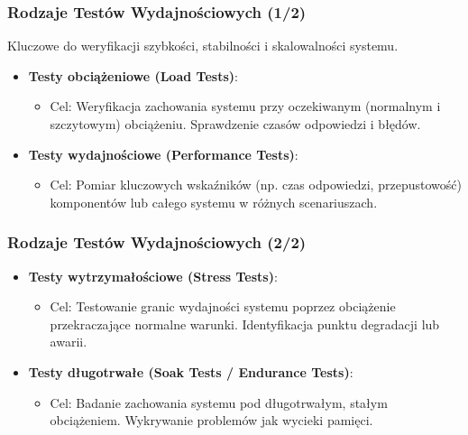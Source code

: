 \documentclass[aspectratio=169,xcolor=table]{beamer}
\begin{document}
\begin{frame}
  \frametitle{Rodzaje Testów Wydajnościowych (1/2)}
  Kluczowe do weryfikacji szybkości, stabilności i skalowalności systemu.
  \begin{itemize}
    \item \textbf{Testy obciążeniowe (Load Tests)}:
        \begin{itemize}
            \item Cel: Weryfikacja zachowania systemu przy oczekiwanym (normalnym i szczytowym) obciążeniu. Sprawdzenie czasów odpowiedzi i błędów.
        \end{itemize}
    \item \textbf{Testy wydajnościowe (Performance Tests)}:
        \begin{itemize}
            \item Cel: Pomiar kluczowych wskaźników (np. czas odpowiedzi, przepustowość) komponentów lub całego systemu w różnych scenariuszach.
        \end{itemize}
  \end{itemize}
\end{frame}

\begin{frame}
  \frametitle{Rodzaje Testów Wydajnościowych (2/2)}
  \begin{itemize}
    \item \textbf{Testy wytrzymałościowe (Stress Tests)}:
        \begin{itemize}
            \item Cel: Testowanie granic wydajności systemu poprzez obciążenie przekraczające normalne warunki. Identyfikacja punktu degradacji lub awarii.
        \end{itemize}
    \item \textbf{Testy długotrwałe (Soak Tests / Endurance Tests)}:
        \begin{itemize}
            \item Cel: Badanie zachowania systemu pod długotrwałym, stałym obciążeniem. Wykrywanie problemów jak wycieki pamięci.
        \end{itemize}
  \end{itemize}
\end{frame}
\end{document}

